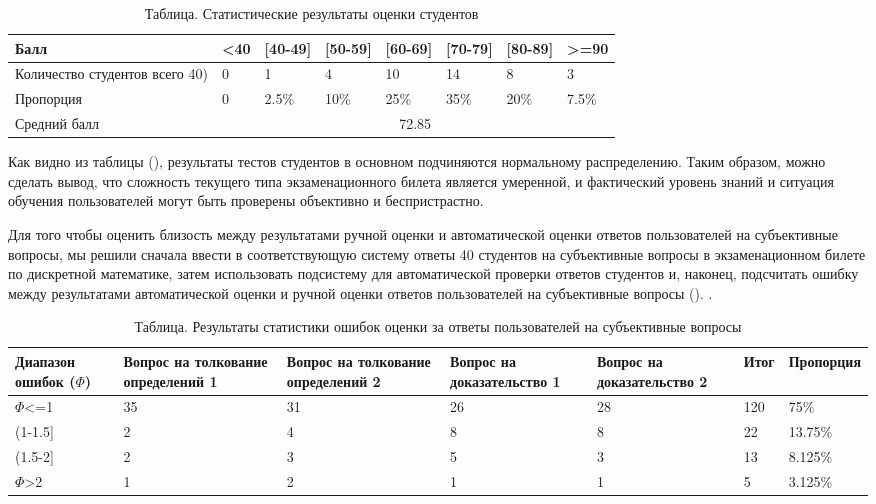 \begin{table}[!htbp]
	\centering
	\caption{Таблица. Статистические результаты оценки студентов}
	\label{tab:score_exam_paper}
		\begin{tabular}{|p{}|p{}|p{}|p{}|p{}|p{}|p{}|p{}|} 
			\hline 
			Балл& <40 & [40-49] & [50-59] & [60-69] & [70-79] & [80-89] & >=90 \\
			\hline  
			Количество студентов всего 40) & 0 & 1 & 4 & 10 & 14 & 8 &3 \\
			\hline
			Пропорция & 0 & 2.5\% & 10\% & 25\% & 35\% & 20\% & 7.5\% \\
			\hline
			Средний балл & \multicolumn{7}{c|}{72.85} \\
			\hline  
		\end{tabular}
\end{table}

Как видно из таблицы (\textit{}), результаты тестов студентов в основном подчиняются нормальному распределению. Таким образом, можно сделать вывод, что  сложность текущего типа экзаменационного билета является умеренной, и фактический уровень знаний и ситуация обучения пользователей могут быть проверены объективно и беспристрастно.

Для того чтобы оценить близость между результатами ручной оценки и автоматической оценки ответов пользователей на субъективные вопросы, мы решили сначала ввести в соответствующую систему ответы 40 студентов на субъективные вопросы в экзаменационном билете по дискретной математике, затем использовать подсистему для автоматической проверки ответов студентов и, наконец, подсчитать ошибку между результатами автоматической оценки и ручной оценки ответов пользователей на субъективные вопросы (\textit{}). .

\begin{table}[!htbp]
	\centering
	\caption{Таблица. Результаты статистики ошибок оценки за ответы пользователей на субъективные вопросы}
	\label{tab:error_statistics_result}
		\begin{tabular}{|p{}|p{}|p{}|p{}|p{}|p{}|p{}|} 
			\hline 
			Диапазон ошибок ($\Phi $) & Вопрос на  толкование  определений 1 & Вопрос на  толкование  определений 2 & Вопрос на  доказательство 1 & Вопрос на  доказательство 2 & Итог & Пропорция \\
			\hline  
			$\Phi$<=1 & 35 & 31 & 26 & 28 & 120 & 75\% \\
			\hline
			(1-1.5] & 2 & 4 & 8 & 8 & 22 & 13.75\% \\
			\hline
			(1.5-2] & 2 & 3 & 5 & 3 & 13 & 8.125\% \\
			\hline
			$\Phi$>2 & 1 & 2 & 1 & 1 & 5 & 3.125\% \\
			\hline
		\end{tabular}
\end{table}

